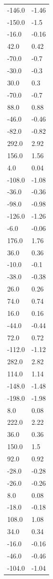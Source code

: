 \begin{longtable}{ll}
-146.0 & -1.46 \\
-150.0 & -1.5 \\
-16.0 & -0.16 \\
42.0 & 0.42 \\
-70.0 & -0.7 \\
-30.0 & -0.3 \\
30.0 & 0.3 \\
-70.0 & -0.7 \\
88.0 & 0.88 \\
-46.0 & -0.46 \\
-82.0 & -0.82 \\
292.0 & 2.92 \\
156.0 & 1.56 \\
4.0 & 0.04 \\
-108.0 & -1.08 \\
-36.0 & -0.36 \\
-98.0 & -0.98 \\
-126.0 & -1.26 \\
-6.0 & -0.06 \\
176.0 & 1.76 \\
36.0 & 0.36 \\
-10.0 & -0.1 \\
-38.0 & -0.38 \\
26.0 & 0.26 \\
74.0 & 0.74 \\
16.0 & 0.16 \\
-44.0 & -0.44 \\
72.0 & 0.72 \\
-112.0 & -1.12 \\
282.0 & 2.82 \\
114.0 & 1.14 \\
-148.0 & -1.48 \\
-198.0 & -1.98 \\
8.0 & 0.08 \\
222.0 & 2.22 \\
36.0 & 0.36 \\
150.0 & 1.5 \\
92.0 & 0.92 \\
-28.0 & -0.28 \\
-26.0 & -0.26 \\
8.0 & 0.08 \\
-18.0 & -0.18 \\
108.0 & 1.08 \\
34.0 & 0.34 \\
-16.0 & -0.16 \\
-46.0 & -0.46 \\
-104.0 & -1.04 \\

\end{longtable}

